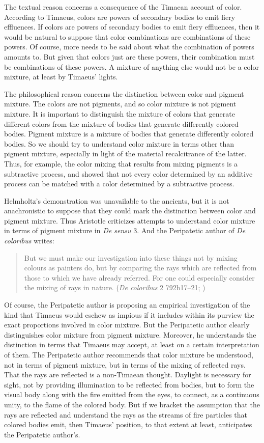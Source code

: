 The textual reason concerns a consequence of the Timaean account of color. According to Timaeus, colors are powers of secondary bodies to emit fiery effluences. If colors are powers of secondary bodies to emit fiery effluences, then it would be natural to suppose that color combinations are combinations of these powers. Of course, more needs to be said about what the combination of powers amounts to. But given that colors just are these powers, their combination must be combinations of these powers. A mixture of anything else would not be a color mixture, at least by Timaeus' lights.

The philosophical reason concerns the distinction between color and pigment mixture. The colors are not pigments, and so color mixture is not pigment mixture. It is important to distinguish the mixture of colors that generate different colors from the mixture of bodies that generate differently colored bodies. Pigment mixture is a mixture of bodies that generate differently colored bodies. So we should try to understand color mixture in terms other than pigment mixture, especially in light of the material recalcitrance of the latter. Thus, for example, the color mixing that results from mixing pigments is a subtractive process, and \citet{Helmholtz:1852ab} showed that not every color determined by an additive process can be matched with a color determined by a subtractive process. 

Helmholtz's demonstration was unavailable to the ancients, but it is not anachronistic to suppose that they could mark the distinction between color and pigment mixture. Thus Aristotle criticizes attempts to understand color mixture in terms of pigment mixture in \emph{De sensu} 3. And the Peripatetic author of \emph{De coloribus} writes: 
\begin{quote}
	But we must make our investigation into these things not by mixing colours as painters do, but by comparing the rays which are reflected from those to which we have already referred. For one could especially consider the mixing of rays in nature. (\emph{De coloribus} 2 792b17--21; \citealt[13]{Hett:1936sd})
\end{quote}
Of course, the Peripatetic author is proposing an empirical investigation of the kind that Timaeus would eschew as impious if it includes within its purview the exact proportions involved in color mixture. But the Peripatetic author clearly distinguishes color mixture from pigment mixture. Moreover, he understands the distinction in terms that Timaeus may accept, at least on a certain interpretation of them. The Peripatetic author recommends that color mixture be understood, not in terms of pigment mixture, but in terms of the mixing of reflected rays. That the rays are reflected is a non-Timaean thought. Daylight is necessary for sight, not by providing illumination to be reflected from bodies, but to form the visual body along with the fire emitted from the eyes, to connect, as a continuous unity, to the flame of the colored body. But if we bracket the assumption that the rays are reflected and understand the rays as the streams of fire particles that colored bodies emit, then Timaeus' position, to that extent at least, anticipates the Peripatetic author's.

